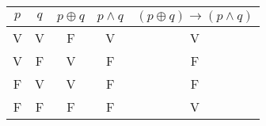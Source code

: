\documentclass{article}
\begin{document}
\begin{center}
    \begin{tabular}{|c|c|c|c|c|}
        \hline
        \( p \) & \( q \) & \( p \oplus q \) & \( p \land q \) & \( (p \oplus q) \rightarrow (p \land q) \) \\  
        \hline
        V & V & F & V & V \\  
        V & F & V & F & F \\  
        F & V & V & F & F \\  
        F & F & F & F & V \\  
        \hline
    \end{tabular}
\end{center}
\end{document}
